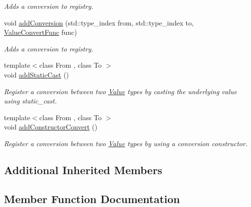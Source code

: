 \begin{DoxyCompactItemize}
\begin{DoxyCompactList}\small\item\em Adds a conversion to registry. \end{DoxyCompactList}\item 
void \hyperlink{classdg_1_1deepcore_1_1_conversion_ad8f548b6ddf848f7e9a79ba164312882}{add\+Conversion} (std\+::type\+\_\+index from, std\+::type\+\_\+index to, \hyperlink{group___process_type_ga213a2a633d6658f67842bd2958c82c78}{Value\+Convert\+Func} func)
\begin{DoxyCompactList}\small\item\em Adds a conversion to registry. \end{DoxyCompactList}\item 
{\footnotesize template$<$class From , class To $>$ }\\void \hyperlink{classdg_1_1deepcore_1_1_conversion_adc788586419bb0aec5886b713920a52c}{add\+Static\+Cast} ()
\begin{DoxyCompactList}\small\item\em Register a conversion between two \hyperlink{classdg_1_1deepcore_1_1_value}{Value} types by casting the underlying value using static\+\_\+cast. \end{DoxyCompactList}\item 
{\footnotesize template$<$class From , class To $>$ }\\void \hyperlink{classdg_1_1deepcore_1_1_conversion_a50852fd3a7d7f6ed685b2b280936e129}{add\+Constructor\+Convert} ()
\begin{DoxyCompactList}\small\item\em Register a conversion between two \hyperlink{classdg_1_1deepcore_1_1_value}{Value} types by using a conversion constructor. \end{DoxyCompactList}\end{DoxyCompactItemize}
\subsection*{Additional Inherited Members}


\subsection{Member Function Documentation}
